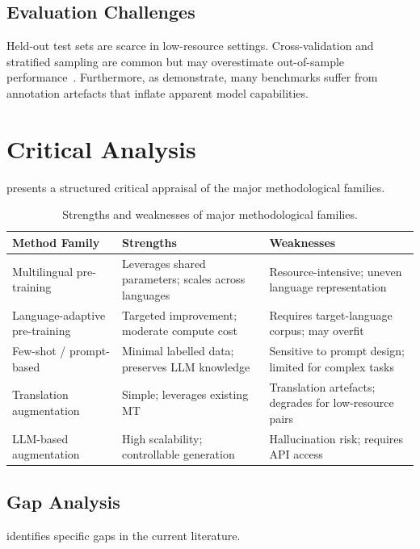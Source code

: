 \documentclass[
    language=english,
    doctype=article,
    institution=none,
    titlestyle=book,
]{../../omnilatex}
\begin{document}
\subsection{Evaluation Challenges}
Held-out test sets are scarce in low-resource settings.  Cross-validation and
stratified sampling are common but may overestimate out-of-sample
performance~\cite{blitzstein2021sample}.  Furthermore, as
\parencite{geiger2024evaluating} demonstrate, many benchmarks suffer from
annotation artefacts that inflate apparent model capabilities.

\section{Critical Analysis}
\label{sec:critical}
 presents a structured critical appraisal of
the major methodological families.

\begin{table}[htbp]
\centering
\caption{Strengths and weaknesses of major methodological families.}
\label{tab:strengths-weaknesses}
\small
\begin{tabular}{p{3.5cm}p{4.5cm}p{4.5cm}}
\toprule
\textbf{Method Family} & \textbf{Strengths} & \textbf{Weaknesses} \\
\midrule
Multilingual pre-training
    & Leverages shared parameters; scales across languages
    & Resource-intensive; uneven language representation \\
\midrule
Language-adaptive pre-training
    & Targeted improvement; moderate compute cost
    & Requires target-language corpus; may overfit \\
\midrule
Few-shot / prompt-based
    & Minimal labelled data; preserves LLM knowledge
    & Sensitive to prompt design; limited for complex tasks \\
\midrule
Translation augmentation
    & Simple; leverages existing MT
    & Translation artefacts; degrades for low-resource pairs \\
\midrule
LLM-based augmentation
    & High scalability; controllable generation
    & Hallucination risk; requires API access \\
\bottomrule
\end{tabular}
\end{table}

\subsection{Gap Analysis}
 identifies specific gaps in the current literature.
\end{document}
